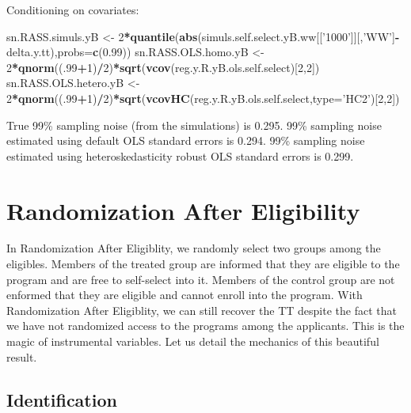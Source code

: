 \documentclass[]{book}
\newenvironment{Shaded}{\begin{snugshade}}{\end{snugshade}}
\newcommand{\KeywordTok}[1]{\textcolor[rgb]{0.13,0.29,0.53}{\textbf{#1}}}
\newcommand{\DataTypeTok}[1]{\textcolor[rgb]{0.13,0.29,0.53}{#1}}
\newcommand{\DecValTok}[1]{\textcolor[rgb]{0.00,0.00,0.81}{#1}}
\newcommand{\FloatTok}[1]{\textcolor[rgb]{0.00,0.00,0.81}{#1}}
\newcommand{\StringTok}[1]{\textcolor[rgb]{0.31,0.60,0.02}{#1}}
\newcommand{\OperatorTok}[1]{\textcolor[rgb]{0.81,0.36,0.00}{\textbf{#1}}}
\newcommand{\NormalTok}[1]{#1}
\theoremstyle{definition}
\theoremstyle{definition}
\theoremstyle{definition}
\theoremstyle{remark}
\begin{document}
Conditioning on covariates:

\begin{Shaded}
\begin{Highlighting}[]
\NormalTok{sn.RASS.simuls.yB <-}\StringTok{ }\DecValTok{2}\OperatorTok{*}\KeywordTok{quantile}\NormalTok{(}\KeywordTok{abs}\NormalTok{(simuls.self.select.yB.ww[[}\StringTok{'1000'}\NormalTok{]][,}\StringTok{'WW'}\NormalTok{]}\OperatorTok{-}\NormalTok{delta.y.tt),}\DataTypeTok{probs=}\KeywordTok{c}\NormalTok{(}\FloatTok{0.99}\NormalTok{))}
\NormalTok{sn.RASS.OLS.homo.yB <-}\StringTok{ }\DecValTok{2}\OperatorTok{*}\KeywordTok{qnorm}\NormalTok{((.}\DecValTok{99}\OperatorTok{+}\DecValTok{1}\NormalTok{)}\OperatorTok{/}\DecValTok{2}\NormalTok{)}\OperatorTok{*}\KeywordTok{sqrt}\NormalTok{(}\KeywordTok{vcov}\NormalTok{(reg.y.R.yB.ols.self.select)[}\DecValTok{2}\NormalTok{,}\DecValTok{2}\NormalTok{])}
\NormalTok{sn.RASS.OLS.hetero.yB <-}\StringTok{ }\DecValTok{2}\OperatorTok{*}\KeywordTok{qnorm}\NormalTok{((.}\DecValTok{99}\OperatorTok{+}\DecValTok{1}\NormalTok{)}\OperatorTok{/}\DecValTok{2}\NormalTok{)}\OperatorTok{*}\KeywordTok{sqrt}\NormalTok{(}\KeywordTok{vcovHC}\NormalTok{(reg.y.R.yB.ols.self.select,}\DataTypeTok{type=}\StringTok{'HC2'}\NormalTok{)[}\DecValTok{2}\NormalTok{,}\DecValTok{2}\NormalTok{])}
\end{Highlighting}
\end{Shaded}

True 99\% sampling noise (from the simulations) is 0.295. 99\% sampling
noise estimated using default OLS standard errors is 0.294. 99\%
sampling noise estimated using heteroskedasticity robust OLS standard
errors is 0.299.

\section{Randomization After Eligibility}\label{sec:design3}

In Randomization After Eligiblity, we randomly select two groups among
the eligibles. Members of the treated group are informed that they are
eligible to the program and are free to self-select into it. Members of
the control group are not enformed that they are eligible and cannot
enroll into the program. With Randomization After Eligiblity, we can
still recover the TT despite the fact that we have not randomized access
to the programs among the applicants. This is the magic of instrumental
variables. Let us detail the mechanics of this beautiful result.

\subsection{Identification}\label{identification-2}
\end{document}
